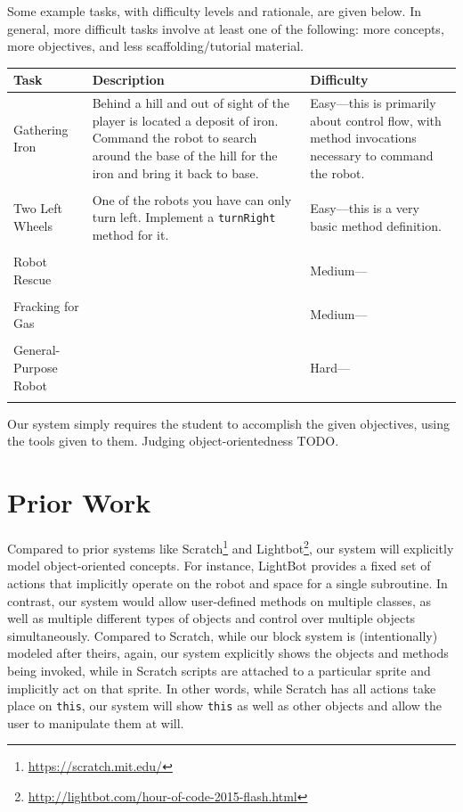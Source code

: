 \documentclass[12pt,notitlepage]{article}
\begin{document}
Some example tasks, with difficulty levels and rationale, are given
below. In general, more difficult tasks involve at least one of the
following: more concepts, more objectives, and less
scaffolding/tutorial material.

\noindent\begin{tabu}{lXX}
  \\
\toprule
Task & Description & Difficulty \\
\midrule
Gathering Iron & Behind a hill and out of sight of the player is
located a deposit of iron. Command the robot to search around the base
of the hill for the iron and bring it back to base.& Easy---this is
primarily about control flow, with method invocations necessary to
command the robot. \\
\\
Two Left Wheels & One of the robots you have can only turn
left. Implement a \texttt{turnRight} method for it. & Easy---this is a
very basic method definition.\\ \\
Robot Rescue & & Medium--- \\ \\
Fracking for Gas & & Medium--- \\ \\
General-Purpose Robot & & Hard--- \\
\bottomrule
\\
\end{tabu}
Our system simply requires the student to accomplish the given
objectives, using the tools given to them. Judging object-orientedness
TODO.

\section{Prior Work}

Compared to prior systems like
Scratch\footnote{\url{https://scratch.mit.edu/}} and
Lightbot\footnote{\url{http://lightbot.com/hour-of-code-2015-flash.html}},
our system will explicitly model object-oriented concepts. For
instance, LightBot provides a fixed set of actions that implicitly
operate on the robot and space for a single subroutine. In contrast,
our system would allow user-defined methods on multiple classes, as
well as multiple different types of objects and control over multiple
objects simultaneously. Compared to Scratch, while our block system is
(intentionally) modeled after theirs, again, our system explicitly
shows the objects and methods being invoked, while in Scratch scripts
are attached to a particular sprite and implicitly act on that
sprite. In other words, while Scratch has all actions take place on
\texttt{this}, our system will show \texttt{this} as well as other
objects and allow the user to manipulate them at will.
\end{document}

